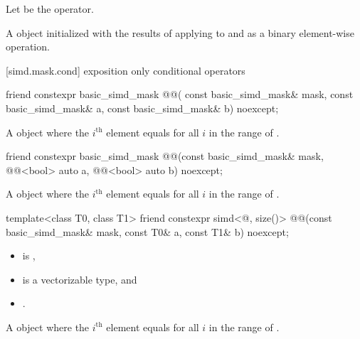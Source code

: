 \begin{itemdescr}
\pnum
Let  be the operator.

\pnum
\returns
A  object initialized with the results of applying
 to  and  as a binary element-wise
operation.
\end{itemdescr}

[simd.mask.cond]{ exposition only conditional operators}

\begin{itemdecl}
friend constexpr basic_simd_mask @@(
  const basic_simd_mask& mask, const basic_simd_mask& a, const basic_simd_mask& b) noexcept;
\end{itemdecl}

\begin{itemdescr}
\pnum
\returns
A  object where the $i^\text{th}$ element equals
 for all $i$ in the range of
.
\end{itemdescr}

\begin{itemdecl}
friend constexpr basic_simd_mask
@@(const basic_simd_mask& mask, @@<bool> auto a, @@<bool> auto b) noexcept;
\end{itemdecl}

\begin{itemdescr}
\pnum
\returns
A  object where the $i^\text{th}$ element equals
 for all $i$ in the range of .
\end{itemdescr}

\begin{itemdecl}
template<class T0, class T1>
  friend constexpr simd<@\seebelow@, size()>
    @@(const basic_simd_mask& mask, const T0& a, const T1& b) noexcept;
\end{itemdecl}

\begin{itemdescr}
\pnum
\constraints
\begin{itemize}
 \item
    is ,
 \item
    is a vectorizable type, and
 \item
   .
\end{itemize}

\pnum
\returns
A  object where the $i^\text{th}$ element equals
 for all $i$ in the range of .
\end{itemdescr}

